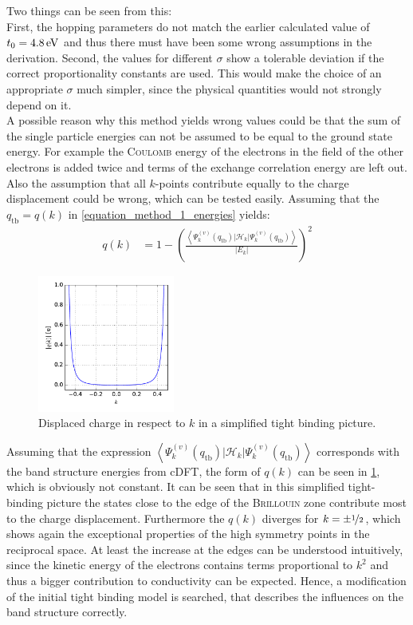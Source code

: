 Two things can be seen from this:\\
First, the hopping parameters do not match the earlier calculated value of $t_0 = \unit[4.8]{eV}$ and thus there must have been some wrong assumptions in the derivation. Second, the values for different $\sigma$ show a tolerable deviation if the correct proportionality constants are used. This would make the choice of an appropriate $\sigma$ much simpler, since the physical quantities would not strongly depend on it.\\
A possible reason why this method yields wrong values could be that the sum of the single particle energies can not be assumed to be equal to the ground state energy. For example the \textsc{Coulomb} energy of the electrons in the field of the other electrons is added twice and terms of the exchange correlation energy are left out. Also the assumption that all $k$-points contribute equally to the charge displacement could be wrong, which can be tested easily. Assuming that the $q_\text{tb} = q(k)$ in \cref{equation_method_1_energies} yields:
\begin{align}
	q(k) &= 1 - \left(\frac{\left\langle\Psi_k^{(v)}(q_\text{tb})\Big|\mathcal{H}_{k}\Big|\Psi_k^{(v)}(q_\text{tb})\right\rangle}{\left|E_k\right|}\right)^{2}
\end{align}
\begin{figure}
	\centering
	\includegraphics[width = 0.4\textwidth]{Images/Hydrogen/charging/charge_vs_k}
	\caption{Displaced charge in respect to $k$ in a simplified tight binding picture.}
	\label{image_tight_binding_q_vs_k}
\end{figure}
Assuming that the expression $\left\langle\Psi_k^{(v)}(q_\text{tb})\Big|\mathcal{H}_{k}\Big|\Psi_k^{(v)}(q_\text{tb})\right\rangle$ corresponds with the band structure energies from cDFT, the form of $q(k)$ can be seen in \cref{image_tight_binding_q_vs_k}, which is obviously not constant. It can be seen that in this simplified tight-binding picture the states close to the edge of the \textsc{Brillouin} zone contribute most to the charge displacement. Furthermore the $q(k)$ diverges for $k = \pm \nicefrac{1}{2}$, which shows again the exceptional properties of the high symmetry points in the reciprocal space. At least the increase at the edges can be understood intuitively, since the kinetic energy of the electrons contains terms proportional to $k^2$ and thus a bigger contribution to conductivity can be expected. Hence, a modification of the initial tight binding model is searched, that describes the influences on the band structure correctly.\\
